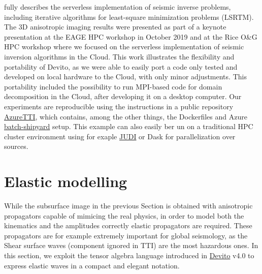 \documentclass[conference]{IEEEtran}
\begin{document}
\cite{witte2019TPDedas} fully describes the serverless implementation
of seismic inverse problems, including iterative algorithms for
least-square minimization problems (LSRTM). The 3D anisotropic imaging
results were presented as part of a keynote presentation at the EAGE HPC
workshop in October 2019 \cite{herrmann2019EAGEHPCaii} and at the Rice
O\&G HPC workshop \cite{witte2019RHPCssi} where we focused on the
serverless implementation of seismic inversion algorithms in the Cloud.
This work illustrates the flexibility and portability of Devito, as we
were able to easily port a code only tested and developed on local
hardware to the Cloud, with only minor adjustments. This portability
included the possibility to run MPI-based code for domain decomposition
in the Cloud, after developing it on a desktop computer. Our experiments
are reproducible using the instructions in a public repository
\href{https://github.com/slimgroup/Azure2019}{AzureTTI}, which contains,
among the other things, the Dockerfiles and Azure
\href{https://batch-shipyard.readthedocs.io}{batch-shipyard} setup. This
example can also easily ber un on a traditional HPC cluster environment
using for exaple \href{https://github.com/slimgroup/JUDI.jl}{JUDI} or
Dask \cite{dask} for parallelization over sources.

\section{Elastic modelling}\label{elastic-modelling}

While the subsurface image in the previous Section is obtained with
anisotropic propagators capable of mimicing the real physics, in order
to model both the kinematics and the amplitudes correctly elastic
propagators are required. These propagators are for example extremely
important for global seismology, as the Shear surface waves (component
ignored in TTI) are the most hazardous ones. In this section, we exploit
the tensor algebra language introduced in
\href{https://github.com/devitocodes/devito}{Devito} v4.0 to express
elastic waves in a compact and elegant notation.
\end{document}
